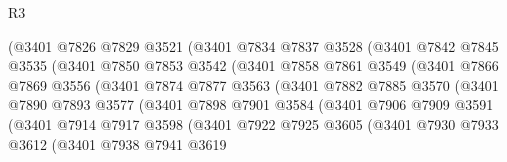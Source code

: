 \begin{lexlean}{R3}
\begin{coremodule}
                      (@3401
                        @7826
                        @7829
                        @3521
                        (@3401
                          @7834
                          @7837
                          @3528
                          (@3401
                            @7842
                            @7845
                            @3535
                            (@3401
                              @7850
                              @7853
                              @3542
                              (@3401
                                @7858
                                @7861
                                @3549
                                (@3401
                                  @7866
                                  @7869
                                  @3556
                                  (@3401
                                    @7874
                                    @7877
                                    @3563
                                    (@3401
                                      @7882
                                      @7885
                                      @3570
                                      (@3401
                                        @7890
                                        @7893
                                        @3577
                                        (@3401
                                          @7898
                                          @7901
                                          @3584
                                          (@3401
                                            @7906
                                            @7909
                                            @3591
                                            (@3401
                                              @7914
                                              @7917
                                              @3598
                                              (@3401
                                                @7922
                                                @7925
                                                @3605
                                                (@3401
                                                  @7930
                                                  @7933
                                                  @3612
                                                  (@3401
                                                    @7938
                                                    @7941
                                                    @3619

\end{coremodule}
\end{lexlean}
